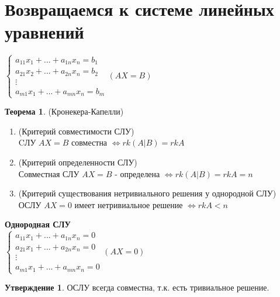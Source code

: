 \documentclass[a4paper, 12pt]{article}
\theoremstyle{definition}
\newtheorem*{theorem}{Теорема}
\newtheorem*{subtheorem}{Утверждение}
\begin{document}
  \section{Возвращаемся к системе линейных уравнений}
  $\begin{cases}
    a_{11}x_1 + ... + a_{1n}x_n = b_1 \\ 
    a_{21}x_2 + ... + a_{2n}x_n = b_2 \\
    \vdots \\
    a_{m1}x_1 + ... + a_{mn}x_n = b_m
  \end{cases} (AX = B)$
  \begin{theorem} (Кронекера-Капелли)
    \begin{enumerate}
      \item (Критерий совместимости СЛУ) \\ CЛУ $AX = B$ совместна $\Longleftrightarrow rk(A|B) = rkA$ 
      \item (Критерий определенности СЛУ) \\ Совместная СЛУ $AX =B$ - определена $\Longleftrightarrow rk(A|B) = rkA = n$ 
      \item (Критерий существования нетривиального решения у однородной СЛУ) \\ ОСЛУ $AX = 0$ имеет нетривиальное решение $\Longleftrightarrow rkA<n$ 
    \end{enumerate}
  \end{theorem}
  \textbf{Однородная СЛУ} \\  
  $\begin{cases}
    a_{11}x_1 + ... + a_{1n}x_n = 0 \\ 
    a_{21}x_1 + ... + a_{2n}x_n = 0 \\
    \vdots \\
    a_{m1}x_1 + ... + a_{mn}x_n = 0
  \end{cases} (AX = 0)$
  \begin{subtheorem}
    ОСЛУ всегда совместна, т.к. есть тривиальное решение.
  \end{subtheorem} 
\end{document}
